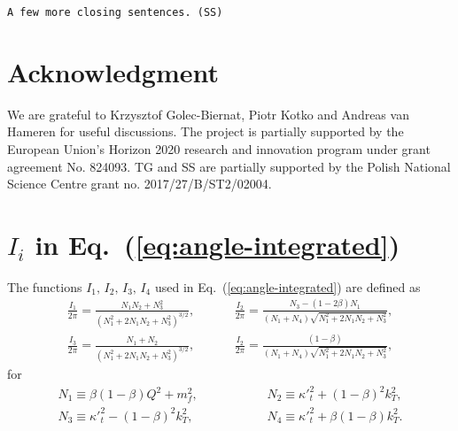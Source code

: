 \documentclass[11pt]{article}
\newcommand{\comment}[1]{\texttt{\color{red}#1}}
\begin{document}
\comment{A few more closing sentences. (SS)}


\section*{Acknowledgment}
We are grateful to Krzysztof Golec-Biernat, Piotr Kotko and Andreas van Hameren
for useful discussions. The project is partially supported by the European
Union’s Horizon 2020 research and innovation program under grant agreement No.
824093.  TG and SS are partially supported by the Polish National Science Centre
grant no. 2017/27/B/ST2/02004.

\appendix
\section{$I_i$ in Eq.~(\ref{eq:angle-integrated})}

The functions $I_1,\, I_2,\,  I_3,\,  I_4$ used in
Eq.~(\ref{eq:angle-integrated}) are defined  as~\cite{Kimber:2001uaa}
%
\begin{equation}
	\begin{split}
		\frac{I_1}{2\pi}=\frac{N_1N_2+N_3^2}{\left( N^2_1+2N_1N_2+N_3^2\right)^{3/2}}, &\hspace{1cm}
		\frac{I_2}{2\pi}=\frac{N_3-(1-2\beta)N_1}{(N_1+N_4)\sqrt{ N^2_1+2N_1N_2+N_3^2}},\\
		\frac{I_3}{2\pi}=\frac{N_1+N_2}{\left( N^2_1+2N_1N_2+N_3^2\right)^{3/2}},&\hspace{1cm}
		\frac{I_2}{2\pi}=\frac{(1-\beta)}{(N_1+N_4)\sqrt{ N^2_1+2N_1N_2+N_3^2}},
	\end{split}
\end{equation}
%
for
%
\begin{equation}
	\begin{split}
		N_1\equiv\beta(1-\beta)Q^2+m_f^2, &\hspace{2cm}
		N_2\equiv{\kappa'}_t^2+(1-\beta)^2k_T^2,\\
		N_3\equiv{\kappa'}_t^2-(1-\beta)^2k_T^2, &\hspace{2cm}
		N_4\equiv{\kappa'}_t^2+\beta(1-\beta)k_T^2.
	\end{split}
\end{equation}



%



%
% 

%
\end{document}

